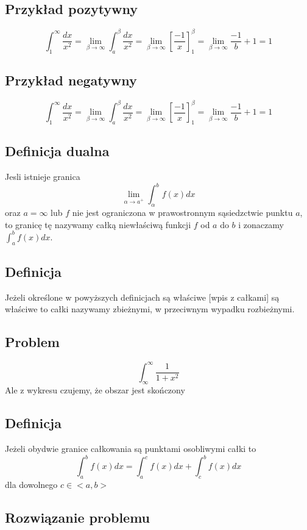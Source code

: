 \documentclass[11pt]{article}
\begin{document}
\subsection{Przykład pozytywny}
$$\int_1^{\infty} \frac{dx}{x^2} = \lim_{\beta \to \infty}{\int_a^{\beta}{\frac{dx}{x^2}}} = \lim_{\beta \to \infty}\left[\frac{-1}{x}\right]_1^{\beta} = \lim_{\beta \to \infty}{\frac{-1}{b} + 1} = 1 $$
\subsection{Przykład negatywny}
$$\int_1^{\infty} \frac{dx}{x^2} = \lim_{\beta \to \infty}{\int_a^{\beta}{\frac{dx}{x^2}}} = \lim_{\beta \to \infty}\left[\frac{-1}{x}\right]_1^{\beta} = \lim_{\beta \to \infty}{\frac{-1}{b} + 1} = 1 $$

\subsection{Definicja dualna}
Jesli istnieje granica $$\lim_{\alpha \to a^+}{\int_\alpha^{b} f(x)dx}$$ oraz $a = \infty$ lub $f$ nie jest ograniczona w prawostronnym sąsiedzctwie punktu $a$, to granicę tę nazywamy całką niewłaściwą funkcji $f$ od $a $ do $b$ i zonaczamy $\int_a^b f(x)dx$.
\subsection{Definicja}
Jeżeli określone w powyższych definicjach są właściwe [wpis z całkami] są właściwe to całki nazywamy zbieżnymi, w przeciwnym wypadku rozbieżnymi.
\subsection{Problem}
$$\int_{\infty}^{\infty}{\frac{1}{1+x^2}}$$
Ale z wykresu czujemy, że obszar jest skończony
\subsection{Definicja}
Jeżeli obydwie granice całkowania są punktami osobliwymi całki to $$\int_a^b f(x)dx = \int_a^c f(x)dx + \int_c^b f(x)dx$$ dla dowolnego $ c \in <a,b> $
\subsection{Rozwiązanie problemu}
\end{document}
